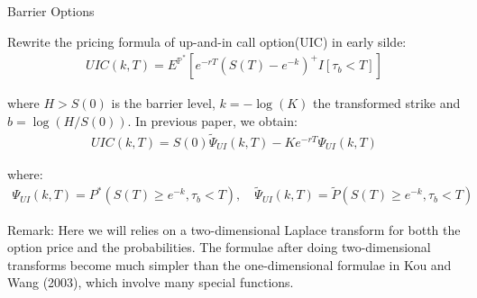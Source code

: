 \documentclass{beamer}
\begin{document}
    
    



\begin{frame}{Barrier Options}

    {\footnotesize \footnotesize
    \par Rewrite the pricing formula of up-and-in call option(UIC) in early silde:
    \begin{align*}
        UIC(k,T) = E^{\mathbb{P}^*} \left[ e^{-rT} \left( S(T) - e^{-k} \right)^+ I{[\tau_b < T]} \right]
    \end{align*}
    \par where \( H > S(0) \) is the barrier level, \( k = -\log(K) \) the transformed strike and \( b = \log(H/S(0)) \). In previous paper, we obtain:
    \begin{align*}
        UIC(k,T) = S(0) \tilde{\Psi}_{UI}(k,T) - Ke^{-rT} \Psi_{UI}(k,T)
    \end{align*}
    \par where:
    \begin{align*}
        \Psi_{UI}(k,T) = P^*(S(T) \geq e^{-k},  \tau_b < T), \quad \widetilde{\Psi}_{UI}(k,T) = \widetilde{P}(S(T) \geq e^{-k},  \tau_b < T) 
    \end{align*}
    \par Remark: Here we will relies on a two-dimensional Laplace transform for botth the option price and the probabilities. The formulae after doing two-dimensional 
    transforms become much simpler than the one-dimensional formulae in Kou and Wang (2003), which involve many special functions.
    }
    
\end{frame}
\end{document}
